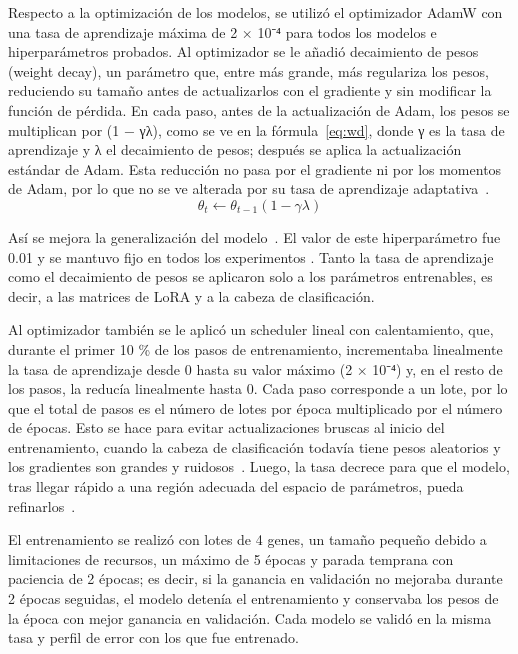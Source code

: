 \documentclass[sigconf,nonacm]{acmart}
\begin{document}
Respecto a la optimización de los modelos, se utilizó el optimizador AdamW con una tasa de aprendizaje máxima de 2 × 10⁻⁴ para todos los modelos e hiperparámetros probados. Al optimizador se le añadió decaimiento de pesos (weight decay), un parámetro que, entre más grande, más regulariza los pesos, reduciendo su tamaño antes de actualizarlos con el gradiente y sin modificar la función de pérdida. En cada paso, antes de la actualización de Adam, los pesos se multiplican por (1 − γλ), como se ve en la fórmula~\eqref{eq:wd}, donde γ es la tasa de aprendizaje y λ el decaimiento de pesos; después se aplica la actualización estándar de Adam. Esta reducción no pasa por el gradiente ni por los momentos de Adam, por lo que no se ve alterada por su tasa de aprendizaje adaptativa~\cite{pytorch_adamw}.
\begin{equation}\label{eq:wd}
\theta_{t} \leftarrow \theta_{t-1}(1-\gamma\lambda)
\end{equation}

Así se mejora la generalización del modelo~\cite{loshchilov2017decoupled}. El valor de este hiperparámetro fue 0.01 y se mantuvo fijo en todos los experimentos . Tanto la tasa de aprendizaje como el decaimiento de pesos se aplicaron solo a los parámetros entrenables, es decir, a las matrices de LoRA y a la cabeza de clasificación.

Al optimizador también se le aplicó un scheduler lineal con calentamiento, que, durante el primer 10 \% de los pasos de entrenamiento, incrementaba linealmente la tasa de aprendizaje desde 0 hasta su valor máximo (2 × 10⁻⁴) y, en el resto de los pasos, la reducía linealmente hasta 0. Cada paso corresponde a un lote, por lo que el total de pasos es el número de lotes por época multiplicado por el número de épocas. Esto se hace para evitar actualizaciones bruscas al inicio del entrenamiento, cuando la cabeza de clasificación todavía tiene pesos aleatorios y los gradientes son grandes y ruidosos~\cite{goyal2017accurate}. Luego, la tasa decrece para que el modelo, tras llegar rápido a una región adecuada del espacio de parámetros, pueda refinarlos~\cite{howard2018universal}.

El entrenamiento se realizó con lotes de 4 genes, un tamaño pequeño debido a limitaciones de recursos, un máximo de 5 épocas y parada temprana con paciencia de 2 épocas; es decir, si la ganancia en validación no mejoraba durante 2 épocas seguidas, el modelo detenía el entrenamiento y conservaba los pesos de la época con mejor ganancia en validación. Cada modelo se validó en la misma tasa y perfil de error con los que fue entrenado.
\end{document}
